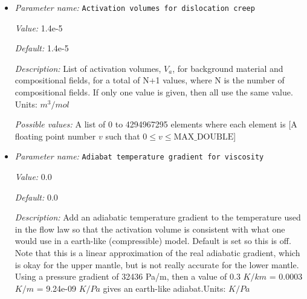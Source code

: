 \begin{itemize}
{\it Default:} 6e-6


{\it Description:} List of activation volumes, $V_a$, for background material and compositional fields, for a total of N+1 values, where N is the number of compositional fields. If only one value is given, then all use the same value.  Units: $m^3 / mol$


{\it Possible values:} A list of 0 to 4294967295 elements where each element is [A floating point number $v$ such that $0 \leq v \leq \text{MAX\_DOUBLE}$]
\item {\it Parameter name:} {\tt Activation volumes for dislocation creep}
\label{parameters:Material model/Visco Plastic/Activation volumes for dislocation creep}
\label{parameters:Material_20model/Visco_20Plastic/Activation_20volumes_20for_20dislocation_20creep}


{\it Value:} 1.4e-5


{\it Default:} 1.4e-5


{\it Description:} List of activation volumes, $V_a$, for background material and compositional fields, for a total of N+1 values, where N is the number of compositional fields. If only one value is given, then all use the same value.  Units: $m^3 / mol$


{\it Possible values:} A list of 0 to 4294967295 elements where each element is [A floating point number $v$ such that $0 \leq v \leq \text{MAX\_DOUBLE}$]
\item {\it Parameter name:} {\tt Adiabat temperature gradient for viscosity}
\label{parameters:Material model/Visco Plastic/Adiabat temperature gradient for viscosity}
\label{parameters:Material_20model/Visco_20Plastic/Adiabat_20temperature_20gradient_20for_20viscosity}


{\it Value:} 0.0


{\it Default:} 0.0


{\it Description:} Add an adiabatic temperature gradient to the temperature used in the flow law so that the activation volume is consistent with what one would use in a earth-like (compressible) model. Default is set so this is off. Note that this is a linear approximation of the real adiabatic gradient, which is okay for the upper mantle, but is not really accurate for the lower mantle. Using a pressure gradient of 32436 Pa/m, then a value of 0.3 $K/km$ = 0.0003 $K/m$ = 9.24e-09 $K/Pa$ gives an earth-like adiabat.Units: $K/Pa$



\end{itemize}
